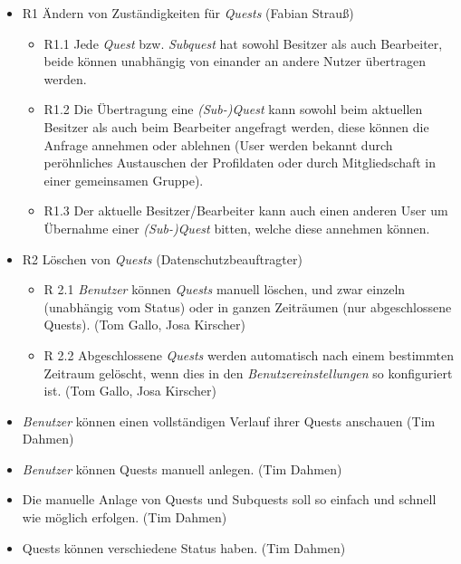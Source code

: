 \documentclass{article}
\begin{document}
\begin{itemize}
\item R1 Ändern von Zuständigkeiten für \textit{Quests} (Fabian Strauß)
    \begin{itemize}
        \item R1.1 Jede \textit{Quest} bzw. \textit{Subquest} hat sowohl Besitzer als auch Bearbeiter, beide können unabhängig von einander an andere Nutzer übertragen werden.
	\item R1.2 Die Übertragung eine \textit{(Sub-)Quest} kann sowohl beim aktuellen 	Besitzer als auch beim Bearbeiter angefragt werden, diese können die Anfrage annehmen oder ablehnen (User werden bekannt durch peröhnliches Austauschen der Profildaten oder durch Mitgliedschaft in einer gemeinsamen Gruppe).
 	\item R1.3 Der aktuelle Besitzer/Bearbeiter kann auch einen anderen User um Übernahme einer \textit{(Sub-)Quest} bitten, welche diese annehmen können.
    \end{itemize}    

\item R2 Löschen von \textit{Quests} (Datenschutzbeauftragter) 
	\begin{itemize}
	\item R 2.1 \textit{Benutzer} können \textit{Quests} manuell löschen, und zwar einzeln (unabhängig vom Status) oder in ganzen Zeiträumen (nur abgeschlossene Quests). (Tom Gallo, Josa Kirscher) 
	\item R 2.2 Abgeschlossene \textit{Quests} werden automatisch nach einem bestimmten Zeitraum gelöscht, wenn dies in den \textit{Benutzereinstellungen} so konfiguriert ist. (Tom Gallo, Josa Kirscher)
	\end{itemize}

\item \textit{Benutzer} können einen vollständigen Verlauf ihrer Quests anschauen (Tim Dahmen) 

\item \textit{Benutzer} können Quests manuell anlegen. (Tim Dahmen) 
\item Die manuelle Anlage von Quests und Subquests soll so einfach und schnell wie möglich erfolgen. (Tim Dahmen) 
\item Quests können verschiedene Status haben. (Tim Dahmen) 


\end{itemize}
\end{document}
